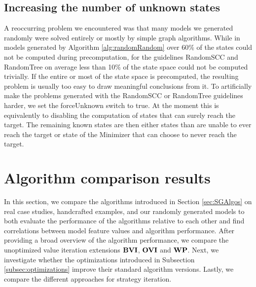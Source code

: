 \subsection{Increasing the number of unknown states}
A reoccurring problem we encountered was that many models we generated randomly were solved entirely or mostly by simple graph algorithms.
While in models generated by Algorithm \ref{alg:randomRandom} over 60\% of the states could not be computed during precomputation, 
for the guidelines RandomSCC and RandomTree on average less than 10\% of the state space could not be computed trivially.
If the entire or most of the state space is precomputed, the resulting problem is usually too easy to draw meaningful conclusions from it.
To artificially make the problems generated with the RandomSCC or RandomTree guidelines harder, we set the forceUnknown switch to true. 
At the moment this is equivalently to disabling the computation of 
states that can surely reach the target.
The remaining known states are then either states than are unable to ever reach the target or state of the Minimizer that can choose to never reach the target.

\section{Algorithm comparison results}
In this section, we compare the algorithms introduced in Section \ref{sec:SGAlgos} on real case studies, handcrafted examples, and our randomly generated models to both evaluate the 
performance of the algorithms relative to each other and find correlations between model feature values and algorithm performance.
After providing a broad overview of the algorithm performance, we compare the unoptimized value iteration extensions $\mathbf{BVI}$, $\mathbf{OVI}$ and $\mathbf{WP}$.
Next, we investigate whether the optimizations introduced in Subsection \ref{subsec:optimizations} improve their standard algorithm versions. Lastly, we compare the different approaches for strategy iteration. 

